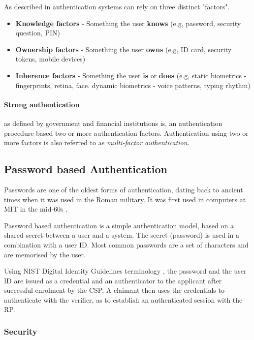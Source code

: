 As described in \cite{council2005authentication} authentication systems can rely on three distinct "factors".

\begin{itemize}
	\item \textbf{Knowledge factors} - Something the user \textbf{knows} (e.g, password, security question, PIN)
	\item \textbf{Ownership factors} - Something the user \textbf{owns} (e.g, ID card, security tokens, mobile devices)
	\item \textbf{Inherence factors} - Something the user \textbf{is} or \textbf{does} (e.g, static biometrics - fingerprints, retina, face. dynamic biometrics - voice patterns, typing rhythm)
\end{itemize}

\paragraph{Strong authentication} as defined by government and financial institutions is, an authentication procedure based two or more authentication factors. Authentication using two or more factors is also referred to as \textit{multi-factor authentication}.

\subsection{Password based Authentication}

Passwords are one of the oldest forms of authentication, dating back to ancient times when it was used in the Roman military. It was first used in computers at MIT in the mid-60s \cite{mcmillan2012password}.

Password based authentication is a simple authentication model, based on a shared secret between a user and a system. The secret (password) is used in a combination with a user ID. Most common passwords are a set of characters and are memorised by the user.

Using NIST Digital Identity Guidelines terminology \cite{grassi2017}, the password and the user ID are issued as a credential and an authenticator to the applicant after successful enrolment by the CSP.
A claimant then uses the credentials to authenticate with the verifier, as to establish an authenticated session with the RP.


\subsubsection{Security}


